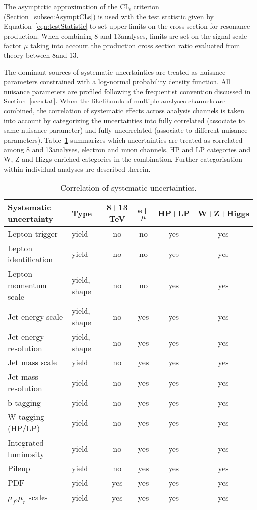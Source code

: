 The asymptotic approximation of the $\mathrm{CL_s}$ criterion (Section~\ref{subsec:AsymptCLs}) is used with the test statistic given by Equation~\ref{eqn:testStatistic} to set upper limits on the cross section for resonance production.
When combining 8 and 13\TeV analyses, limits are set on the signal scale factor $\mu$ taking into account the production cross section ratio evaluated from theory between 8\TeV and 13\TeV.

The dominant sources of systematic uncertainties are treated as nuisance parameters constrained with a log-normal probability density function.
All nuisance parameters are profiled following the frequentist convention discussed in Section~\ref{sec:stat}.
When the likelihoods of multiple analyses channels are combined, the correlation of systematic effects across analysis channels is taken into account by categorizing the uncertainties into fully correlated (associate to same nuisance parameter) and fully uncorrelated (associate to different nuisance parameters).
Table~\ref{tab:correlations} summarizes which uncertainties are treated as correlated among 8 and 13\TeV analyses, electron and muon channels, HP and LP categories and W, Z and Higgs enriched categories in the combination.
Further categorisation within individual analyses are described therein.

\begin{table}[htb]
  \centering
  \caption{Correlation of systematic uncertainties.
}
  \begin{tabular}{l l c c c c}
    \hline
    Systematic uncertainty & Type & 8+13 TeV & e+$\mu$ & HP+LP & W+Z+Higgs \\
    \hline
    Lepton trigger & yield & no & no & yes & yes \\
    Lepton identification & yield & no & no & yes & yes \\
    Lepton momentum scale & yield, shape & no & no & yes & yes \\
    Jet energy scale & yield, shape & no & yes & yes & yes \\
    Jet energy resolution & yield, shape & no & yes & yes & yes \\
    Jet mass scale & yield & no & yes & yes & yes \\
    Jet mass resolution & yield & no & yes & yes & yes \\
    b tagging & yield & no & yes & yes & yes \\ 
    W tagging \nsubj{} (HP/LP) & yield & no & yes & yes & yes \\
    Integrated luminosity & yield & no & yes & yes & yes \\
    Pileup & yield & no & yes & yes & yes \\
    PDF & yield & yes & yes & yes & yes \\
    $\mu_{f}$,$\mu_{r}$ scales & yield & yes & yes & yes & yes \\
    \hline
  \end{tabular}
  \label{tab:correlations}
\end{table}

